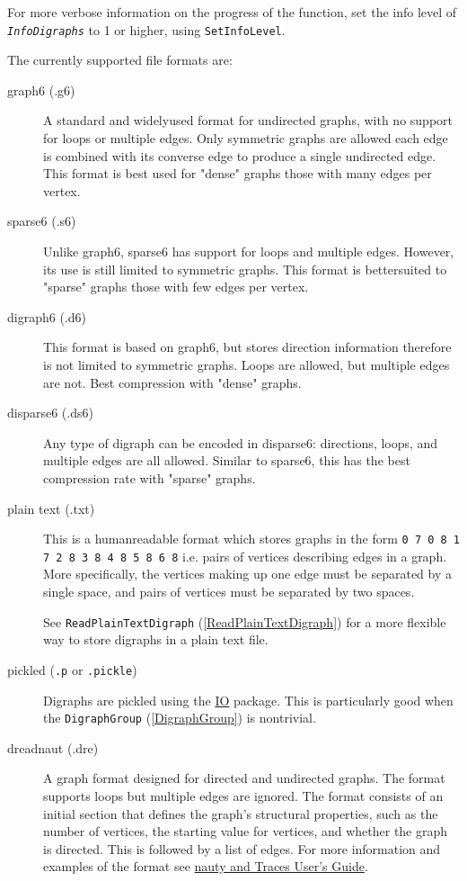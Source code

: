 \documentclass[a4paper,11pt]{report}
\begin{document}
{{{  For more verbose information on the progress of the function, set the info
level of \mbox{\texttt{\mdseries\slshape InfoDigraphs}} to 1 or higher, using \texttt{SetInfoLevel}.

 The currently supported file formats are: 
\begin{description}
\item[{graph6 (.g6)}]  A standard and widely\texttt{}used format for undirected graphs,
with no support for loops or multiple edges. Only symmetric graphs are allowed
\texttt{}\texttt{} each edge is combined with its
converse edge to produce a single undirected edge. This format is best used
for "dense" graphs \texttt{}\texttt{} those with many
edges per vertex. 
\item[{sparse6 (.s6)}]  Unlike graph6, sparse6 has support for loops and multiple edges. However, its
use is still limited to symmetric graphs. This format is
better\texttt{}suited to "sparse" graphs
\texttt{}\texttt{} those with few edges per vertex. 
\item[{digraph6 (.d6)}]  This format is based on graph6, but stores direction information
\texttt{} therefore is not limited to symmetric graphs. Loops are
allowed, but multiple edges are not. Best compression with "dense" graphs. 
\item[{disparse6 (.ds6)}]  Any type of digraph can be encoded in disparse6: directions, loops, and
multiple edges are all allowed. Similar to sparse6, this has the best
compression rate with "sparse" graphs. 
\item[{plain text (.txt)}]  This is a human\texttt{}readable format which stores graphs in the
form \texttt{0 7 0 8 1 7 2 8 3 8 4 8 5 8 6 8} i.e. pairs of vertices describing edges in a graph. More specifically, the
vertices making up one edge must be separated by a single space, and pairs of
vertices must be separated by two spaces. 

 See \texttt{ReadPlainTextDigraph} (\ref{ReadPlainTextDigraph}) for a more flexible way to store digraphs in a plain text file. 

  
\item[{pickled (\texttt{.p} or \texttt{.pickle})}]  Digraphs are pickled using the \href{https://gap-packages.github.io/io} {IO}  package. This is particularly good when the \texttt{DigraphGroup} (\ref{DigraphGroup}) is non\texttt{}trivial. 
\item[{dreadnaut (.dre)}]  A graph format designed for directed and undirected graphs. The format
supports loops but multiple edges are ignored. The format consists of an
initial section that defines the graph's structural properties, such as the
number of vertices, the starting value for vertices, and whether the graph is
directed. This is followed by a list of edges. For more information and
examples of the format see \href{http://pallini.di.uniroma1.it/Guide.html} {nauty and Traces User's Guide}. 


\end{description}}}}
\end{document}
